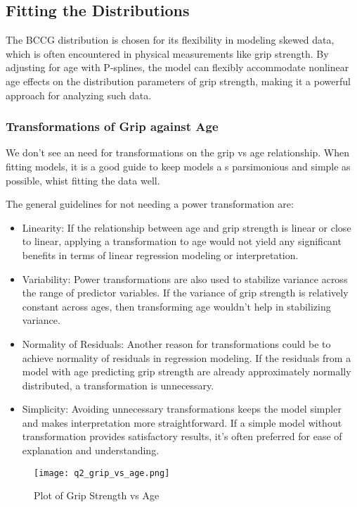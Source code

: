\subsection{Fitting the Distributions}

The BCCG distribution is chosen for its flexibility in modeling skewed data, which is often encountered in physical measurements
like grip strength. By adjusting for age with P-splines, the model can flexibly accommodate nonlinear age effects on the
distribution parameters of grip strength, making it a powerful approach for analyzing such data.


\subsubsection{Transformations of Grip against Age}

We don't see an need for transformations on the grip vs age relationship.   When fitting models, it is a good guide to keep models a
s parsimonious and simple as possible, whist fitting the data well.

The general guidelines for not needing a power transformation are:
\begin{itemize}
\item  Linearity: If the relationship between age and grip strength is linear or close to linear, applying a
  transformation to age would not yield any significant benefits in terms of linear regression modeling or interpretation.
\item  Variability: Power transformations are also used to stabilize variance across the range of predictor variables.
  If the variance of grip strength is relatively constant across ages, then transforming age wouldn't help in stabilizing variance.
\item  Normality of Residuals: Another reason for transformations could be to achieve normality of residuals in regression
  modeling. If the residuals from a model with age predicting grip strength are already approximately normally distributed,
  a transformation is unnecessary.
\item  Simplicity: Avoiding unnecessary transformations keeps the model simpler and makes interpretation more straightforward.
  If a simple model without transformation provides satisfactory results, it's often preferred for ease of
  explanation and understanding.
\end{itemize}

\begin{figure}[H]
  \texttt{[image: q2\_grip\_vs\_age.png]}
  \caption{Plot of Grip Strength vs Age}
\end{figure}

